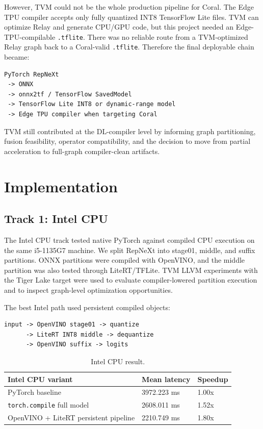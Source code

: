 \documentclass[11pt]{article}
\begin{document}
However, TVM could not be the whole production pipeline for Coral. The Edge TPU compiler accepts only fully quantized INT8 TensorFlow Lite files. TVM can optimize Relay and generate CPU/GPU code, but this project needed an Edge-TPU-compilable \texttt{.tflite}. There was no reliable route from a TVM-optimized Relay graph back to a Coral-valid \texttt{.tflite}. Therefore the final deployable chain became:

\begin{lstlisting}
PyTorch RepNeXt
 -> ONNX
 -> onnx2tf / TensorFlow SavedModel
 -> TensorFlow Lite INT8 or dynamic-range model
 -> Edge TPU compiler when targeting Coral
\end{lstlisting}

TVM still contributed at the DL-compiler level by informing graph partitioning, fusion feasibility, operator compatibility, and the decision to move from partial acceleration to full-graph compiler-clean artifacts.

\section{Implementation}

\subsection{Track 1: Intel CPU}

The Intel CPU track tested native PyTorch against compiled CPU execution on the same i5-1135G7 machine. We split RepNeXt into stage01, middle, and suffix partitions. ONNX partitions were compiled with OpenVINO, and the middle partition was also tested through LiteRT/TFLite. TVM LLVM experiments with the Tiger Lake target were used to evaluate compiler-lowered partition execution and to inspect graph-level optimization opportunities.

The best Intel path used persistent compiled objects:

\begin{lstlisting}
input -> OpenVINO stage01 -> quantize
      -> LiteRT INT8 middle -> dequantize
      -> OpenVINO suffix -> logits
\end{lstlisting}

\begin{table}[H]
\centering
\caption{Intel CPU result.}
\small
\begin{tabularx}{\textwidth}{Y Z{0.18\textwidth} Z{0.18\textwidth}}
\toprule
Intel CPU variant & Mean latency & Speedup \\
\midrule
PyTorch baseline & 3972.223 ms & 1.00x \\
\texttt{torch.compile} full model & 2608.011 ms & 1.52x \\
OpenVINO + LiteRT persistent pipeline & 2210.749 ms & 1.80x \\
\bottomrule
\end{tabularx}
\end{table}
\end{document}
